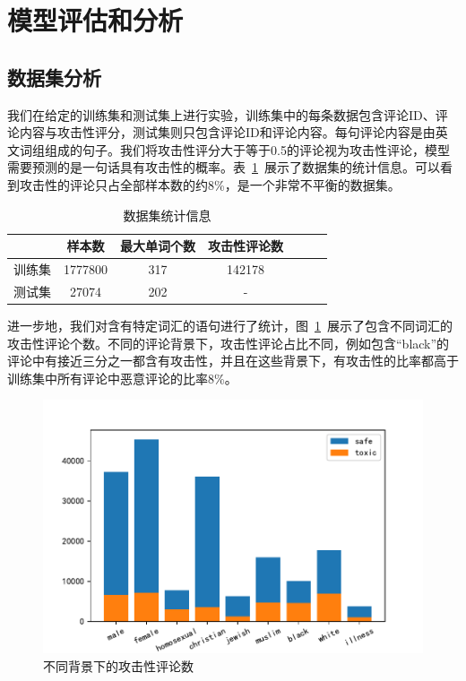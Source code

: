 \section{模型评估和分析} %

\subsection{数据集分析}

我们在给定的训练集和测试集上进行实验，训练集中的每条数据包含评论ID、评论内容与攻击性评分，测试集则只包含评论ID和评论内容。每句评论内容是由英文词组组成的句子。我们将攻击性评分大于等于0.5的评论视为攻击性评论，模型需要预测的是一句话具有攻击性的概率。表~\ref{tab:dataset}~展示了数据集的统计信息。可以看到攻击性的评论只占全部样本数的约8\%，是一个非常不平衡的数据集。

\begin{table}[htbp]
    \centering
    \begin{tabular}{ccccccc}
    \toprule
        & 样本数 & 最大单词个数 & 攻击性评论数 \\
        \midrule
        训练集 & 1777800 & 317 & 142178 \\
        测试集 & 27074 & 202 & - \\
        \bottomrule
    \end{tabular}
    \caption{数据集统计信息}
    \label{tab:dataset}
\end{table}

进一步地，我们对含有特定词汇的语句进行了统计，图~\ref{fig:toxic}~展示了包含不同词汇的攻击性评论个数。不同的评论背景下，攻击性评论占比不同，例如包含``black''的评论中有接近三分之一都含有攻击性，并且在这些背景下，有攻击性的比率都高于训练集中所有评论中恶意评论的比率8\%。

\begin{figure}[htbp]
    \centering
    \includegraphics[width=.56\textwidth]{figs/toxic.pdf}
    \caption{不同背景下的攻击性评论数}
    \label{fig:toxic}
\end{figure}

